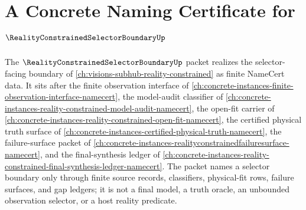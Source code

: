 \chapter{A Concrete Naming Certificate for $\RealityConstrainedSelectorBoundaryUp$}
\label{ch:concrete-instances-reality-constrained-selector-boundary-namecert}

The $\RealityConstrainedSelectorBoundaryUp$ packet realizes the selector-facing boundary of \autoref{ch:visions-subhub-reality-constrained} as finite NameCert data. It sits after the finite observation interface of \autoref{ch:concrete-instances-finite-observation-interface-namecert}, the model-audit classifier of \autoref{ch:concrete-instances-reality-constrained-model-audit-namecert}, the open-fit carrier of \autoref{ch:concrete-instances-reality-constrained-open-fit-namecert}, the certified physical truth surface of \autoref{ch:concrete-instances-certified-physical-truth-namecert}, the failure-surface packet of \autoref{ch:concrete-instances-realityconstrainedfailuresurface-namecert}, and the final-synthesis ledger of \autoref{ch:concrete-instances-reality-constrained-final-synthesis-ledger-namecert}. The packet names a selector boundary only through finite source records, classifiers, physical-fit rows, failure surfaces, and gap ledgers; it is not a final model, a truth oracle, an unbounded observation selector, or a host reality predicate.

